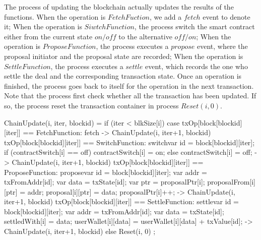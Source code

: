 \documentclass{KERauth}
\begin{document}
The process of updating the blockchain actually updates the results of the functions. When the operation is $FetchFuction$, we add a $fetch$ event to denote it; When the operation is $SiwtchFunction$, the process switch the smart contract either from the current state $on/off$ to the alternative $off/on$; When the operation is $ProposeFunction$, the process executes a $propose$ event, where the proposal initiator and the proposal state are recorded; When the operation is $SettleFunction$, the process executes a $settle$ event, which records the one who settle the deal and the corresponding transaction state. Once an operation is finished, the process goes back to itself for the operation in the next transaction. Note that the process first check whether all the transaction has been updated. If so, the process reset the transaction container in process $Reset(i, 0)$.
\begin{center}
\begin{boxedverbatim}
ChainUpdate(i, iter, blockid) =
  if (iter < blkSize[i]) {
    case {
      txOp[block[blockid][iter]] == FetchFunction:
        fetch ->
        ChainUpdate(i, iter+1, blockid)
      txOp[block[blockid][iter]] == SwitchFunction:
        switch{var id = block[blockid][iter];
                 if (contractSwitch[i] == off) {contractSwitch[i] = on;}
                 else {contractSwitch[i] = off;}} ->
        ChainUpdate(i, iter+1, blockid)
      txOp[block[blockid][iter]] == ProposeFunction:
        propose{var id = block[blockid][iter];
                var addr = txFromAddr[id];
                var data = txState[id];
                var ptr = proposalPtr[i];
                proposalFrom[i][ptr] = addr;
                proposal[i][ptr] = data;
                proposalPtr[i]++; } ->
        ChainUpdate(i, iter+1, blockid)
      txOp[block[blockid][iter]] == SettleFunction:
        settle{var id = block[blockid][iter];
               var addr = txFromAddr[id];
               var data = txState[id];
               settledWith[i] = data;
               userWallet[i][data] = userWallet[i][data] + txValue[id];	} ->
        ChainUpdate(i, iter+1, blockid)}}
  else {Reset(i, 0)	};
\end{boxedverbatim}
\end{center}
\end{document}
